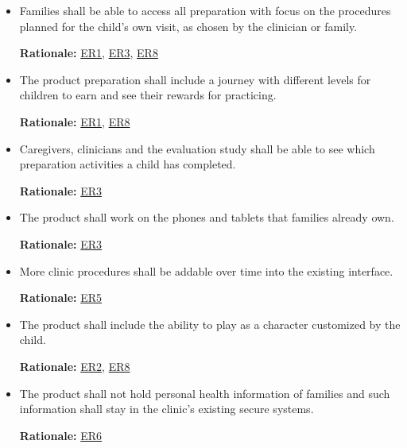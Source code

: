 \documentclass[12pt]{article}
\newcounter{srnum} %
\begin{document}
\begin{itemize}
\textbf{Rationale:} \hyperref[ER1]{ER1}, \hyperref[ER5]{ER5}

\item[\textbf{STR\refstepcounter{srnum}\thesrnum:} \label{SR_Label7}] Families shall be able to access all preparation with 
focus on the procedures planned for the child's own visit, as chosen by the clinician or family.

\textbf{Rationale:} \hyperref[ER1]{ER1}, \hyperref[ER3]{ER3}, \hyperref[ER8]{ER8}

\item[\textbf{STR\refstepcounter{srnum}\thesrnum:} \label{SR_Label8}] The product preparation shall include a journey with 
different levels for children to earn and see their rewards for practicing.

\textbf{Rationale:} \hyperref[ER1]{ER1}, \hyperref[ER8]{ER8}

\item[\textbf{STR\refstepcounter{srnum}\thesrnum:} \label{SR_Label9}] Caregivers, clinicians and the evaluation study shall 
be able to see which preparation activities a child has completed.

\textbf{Rationale:} \hyperref[ER3]{ER3}

\item[\textbf{STR\refstepcounter{srnum}\thesrnum:} \label{SR_Label10}] The product shall work on the phones and tablets that 
families already own.

\textbf{Rationale:} \hyperref[ER3]{ER3}

\item[\textbf{STR\refstepcounter{srnum}\thesrnum:} \label{SR_Label11}] More clinic procedures shall be addable over time into 
the existing interface.

\textbf{Rationale:} \hyperref[ER5]{ER5}

\item[\textbf{STR\refstepcounter{srnum}\thesrnum:} \label{SR_Label12}] The product shall include the ability to play as a 
character customized by the child.

\textbf{Rationale:} \hyperref[ER2]{ER2}, \hyperref[ER8]{ER8}

\item[\textbf{STR\refstepcounter{srnum}\thesrnum:} \label{SR_Label13}] The product shall not hold personal health information 
of families and such information shall stay in the clinic's existing secure systems.

\textbf{Rationale:} \hyperref[ER6]{ER6}


\end{itemize}
\end{document}

